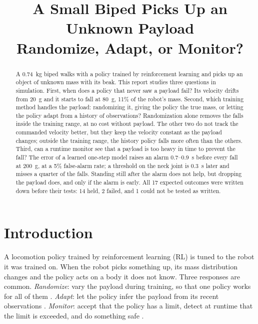 \documentclass[conference]{IEEEtran}
\begin{document}
\title{A Small Biped Picks Up an Unknown Payload\\[4pt] {\Large Randomize, Adapt, or Monitor?}}

\author{
}

\maketitle

\begin{abstract}
A \SI{0.74}{kg} biped walks with a policy trained by reinforcement learning and picks up an object of unknown mass with its beak.
This report studies three questions in simulation.
First, when does a policy that never saw a payload fail? Its velocity drifts from \SI{20}{g} and it starts to fall at \SI{80}{g}, 11\% of the robot's mass.
Second, which training method handles the payload: randomizing it, giving the policy the true mass, or letting the policy adapt from a history of observations?
Randomization alone removes the falls inside the training range, at no cost without payload.
The other two do not track the commanded velocity better, but they keep the velocity constant as the payload changes; outside the training range, the history policy falls more often than the others.
Third, can a runtime monitor see that a payload is too heavy in time to prevent the fall?
The error of a learned one-step model raises an alarm 0.7--\SI{0.9}{s} before every fall at \SI{200}{g}, at a 5\% false-alarm rate; a threshold on the neck joint is \SI{0.3}{s} later and misses a quarter of the falls.
Standing still after the alarm does not help, but dropping the payload does, and only if the alarm is early.
All 17 expected outcomes were written down before their tests: 14 held, 2 failed, and 1 could not be tested as written.
\end{abstract}

\section{Introduction}

A locomotion policy trained by reinforcement learning (RL) is tuned to the robot it was trained on.
When the robot picks something up, its mass distribution changes and the policy acts on a body it does not know.
Three responses are common.
\emph{Randomize}: vary the payload during training, so that one policy works for all of them \cite{tobin2017domain,peng2018sim}.
\emph{Adapt}: let the policy infer the payload from its recent observations \cite{lee2020learning,kumar2021rma}.
\emph{Monitor}: accept that the policy has a limit, detect at runtime that the limit is exceeded, and do something safe \cite{sha2001simplex}.
\end{document}
